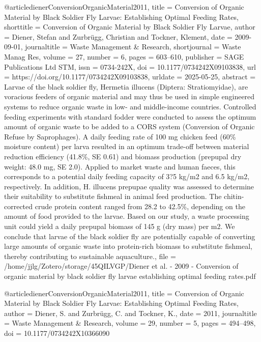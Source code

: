 {{{@article{dienerConversionOrganicMaterial2011,
  title = {Conversion of Organic Material by Black Soldier Fly Larvae: Establishing Optimal Feeding Rates},
  shorttitle = {Conversion of Organic Material by Black Soldier Fly Larvae},
  author = {Diener, Stefan and Zurbrügg, Christian and Tockner, Klement},
  date = {2009-09-01},
  journaltitle = {Waste Management \& Research},
  shortjournal = {Waste Manag Res},
  volume = {27},
  number = {6},
  pages = {603--610},
  publisher = {SAGE Publications Ltd STM},
  issn = {0734-242X},
  doi = {10.1177/0734242X09103838},
  url = {https://doi.org/10.1177/0734242X09103838},
  urldate = {2025-05-25},
  abstract = {Larvae of the black soldier fly, Hermetia illucens (Diptera: Stratiomyidae), are voracious feeders of organic material and may thus be used in simple engineered systems to reduce organic waste in low- and middle-income countries. Controlled feeding experiments with standard fodder were conducted to assess the optimum amount of organic waste to be added to a CORS system (Conversion of Organic Refuse by Saprophages). A daily feeding rate of 100 mg chicken feed (60\% moisture content) per larva resulted in an optimum trade-off between material reduction efficiency (41.8\%, SE 0.61) and biomass production (prepupal dry weight: 48.0 mg, SE 2.0). Applied to market waste and human faeces, this corresponds to a potential daily feeding capacity of 3?5 kg/m2 and 6.5 kg/m2, respectively. In addition, H. illucens prepupae quality was assessed to determine their suitability to substitute fishmeal in animal feed production. The chitin-corrected crude protein content ranged from 28.2 to 42.5\%, depending on the amount of food provided to the larvae. Based on our study, a waste processing unit could yield a daily prepupal biomass of 145 g (dry mass) per m2. We conclude that larvae of the black soldier fly are potentially capable of converting large amounts of organic waste into protein-rich biomass to substitute fishmeal, thereby contributing to sustainable aquaculture.},
  file = {/home/jjlg/Zotero/storage/45QILVGP/Diener et al. - 2009 - Conversion of organic material by black soldier fly larvae establishing optimal feeding rates.pdf}
}

@article{dienerConversionOrganicMaterial2011,
  title = {Conversion of Organic Material by Black Soldier Fly Larvae: {{Establishing}} Optimal Feeding Rates},
  author = {Diener, S. and Zurbrügg, C. and Tockner, K.},
  date = {2011},
  journaltitle = {Waste Management \& Research},
  volume = {29},
  number = {5},
  pages = {494--498},
  doi = {10.1177/0734242X10366090}
}

}}}
